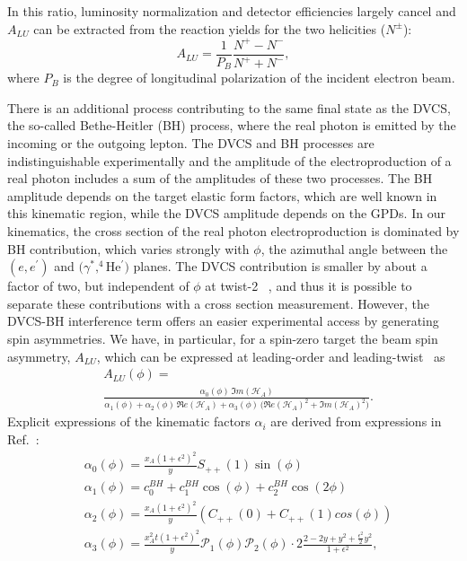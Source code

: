 \documentclass[twocolumn,nofootinbib,showpacs,prl,superscriptaddress,secnumarabic,amssymb,nobibnotes,aps,floatfix]{revtex4}
\begin{document}
In this ratio, luminosity normalization and
detector efficiencies largely cancel and $A_{LU}$ can be 
extracted from the reaction yields for the two helicities ($N^{\pm}$):
\begin{equation}
A_{LU} = \frac{1}{P_{B}} \frac{N^{+} - N^{-}}{N^{+} + N^{-} },
\end{equation}
where $P_{B}$ is the degree of longitudinal polarization of the incident electron beam.

There is an additional process contributing to the same final state as the 
DVCS, the so-called Bethe-Heitler (BH) process, where the real photon is 
emitted by the incoming or the outgoing lepton. The DVCS and BH processes are 
indistinguishable experimentally and the amplitude of the electroproduction of 
a real photon includes a sum of the amplitudes of these two processes. The BH 
amplitude depends on the target elastic form factors, which are well known in 
this kinematic region, while the DVCS amplitude depends on the GPDs. In our 
kinematics, the cross section of the real photon electroproduction is dominated 
by BH contribution, which varies strongly with $\phi$, the azimuthal angle 
between the $(e,e^\prime)$ and $(\gamma^*,^4$He$^\prime)$ planes. The DVCS 
contribution is smaller by about a factor of two, but independent of $\phi$ at twist-2~%
\cite{Belitsky:2001ns}, and thus it is possible to separate these contributions 
with a cross section measurement. However, the DVCS-BH interference term offers 
an easier experimental access by generating spin asymmetries. We have, in 
particular, for a spin-zero target the beam spin asymmetry, $A_{LU}$, which 
can be expressed at leading-order and leading-twist~\cite{Kirchner:2003wt,
Belitsky:2008bz} as
\begin{equation}
\begin{split}
&A_{LU}(\phi) = \\
&\frac{\alpha_{0}(\phi) \, \Im m(\mathcal{H}_{A})}
{\alpha_{1}(\phi) + \alpha_{2}(\phi) \, \Re e(\mathcal{H}_{A}) + \alpha_{3}(\phi) \, 
\big( \Re e(\mathcal{H}_{A})^{2} + \Im m(\mathcal{H}_{A})^{2} \big)}.
\end{split}
\label{eq:A_LU-coh}
\end{equation}
Explicit expressions of the kinematic factors $\alpha_i$ are derived from 
expressions in Ref.~\cite{Belitsky:2008bz}:
\begin{equation}
\begin{split}
&\alpha_0 (\phi)  = \frac{x_{A}(1+\epsilon^2)^2}{y} S_{++}(1) \sin(\phi) \\
&\alpha_1 (\phi)  =  c_0^{BH}+c_1^{BH} \cos({\phi})+c_2^{BH} \cos(2\phi) \\
&\alpha_2 (\phi)  =  \frac{x_{A}(1+\epsilon^2)^2}{y}  \left( C_{++}(0) +  
C_{++}(1) cos(\phi) \right) \\
&\alpha_3 (\phi) = \frac{x^{2}_{A}t(1+\epsilon^2)^2}{y} {\mathcal P}_1(\phi) 
{\mathcal P}_2(\phi) \cdot 2 \frac{2-2y+y^2 + \frac{\epsilon^2}{2}y^2}{1 + 
\epsilon^2},
\end{split}
\end{equation}
\end{document}

